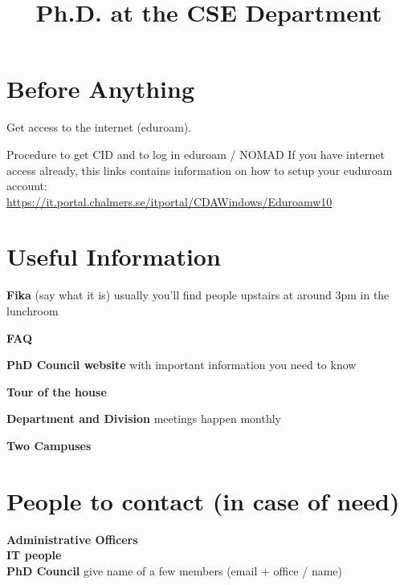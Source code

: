 \documentclass[10pt,a4paper,english]{article}
\title{Ph.D. at the CSE Department}
\begin{document}
\maketitle
\section*{Before Anything}
Get access to the internet (eduroam).

Procedure to get CID and to log in eduroam / NOMAD
If you have internet access already, this links contains information on how to setup your euduroam account: 
\\
\url{https://it.portal.chalmers.se/itportal/CDAWindows/Eduroamw10}
\section*{Useful Information}
\textbf{Fika} (say what it is) usually you'll find people upstairs at around 3pm in the lunchroom

\textbf{FAQ}


\textbf{PhD Council website} with important information you need to know 

\textbf{Tour of the house}

\textbf{Department and Division} meetings happen monthly

\textbf{Two Campuses}

\section*{People to contact (in case of need)}
\textbf{Administrative Officers}
\\
\textbf{IT people}
\\
\textbf{PhD Council} give name of a few members (email + office / name)
\end{document}
